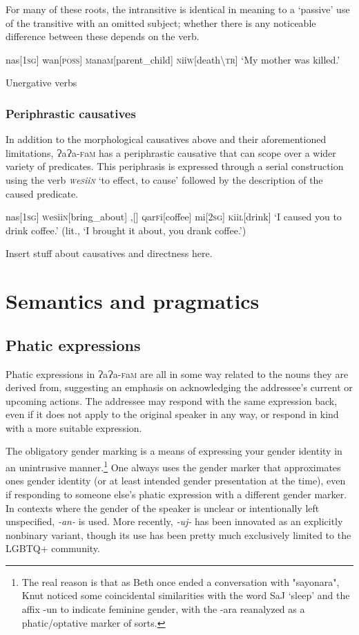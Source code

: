 \documentclass[a4paper,10pt,twoside,openright]{memoir}
\newcommand{\lang}{{\bigglot}a{\bigglot}a-\textsc{f}a\textsc{m}}
\newcommand{\bigglot}{Ɂ}
\newcommand{\famwordold}[5]{#1\textsc{#2}#3\textsc{#4}#5}
\newcommand\famword[1]{{\addfontfeatures{Letters=UppercaseSmallCaps}#1}}
\begin{document}
\noindent For many of these roots, the intransitive is identical in meaning to a `passive' use of the transitive with an omitted subject; whether there is any noticeable difference between these depends on the verb.

\ex
\begingl
nas[\textsc{1sg}]
wan[\textsc{poss}]
\famwordold{}{m}{ana}{m}{}[parent\_child]
\famwordold{}{n}{ii}{w}{}[death\textbackslash\textsc{tr}]
\glft `My mother was killed.'
\endgl
\xe

Unergative verbs

\subsection{Periphrastic causatives}

In addition to the morphological causatives above and their aforementioned limitations, \lang{} has a periphrastic causative that can scope over a wider variety of predicates. This periphrasis is expressed through a serial construction using the verb \textit{\textsc{w}\famwordold{e}{s}{ii}{n}{}} `to effect, to cause' followed by the description of the caused predicate. 

\ex
\begingl
nas[\textsc{1sg}]
\textsc{w}\famwordold{e}{s}{ii}{n}{}[bring\_about]
,[]
\famwordold{}{q}{ar}{f}{i}[coffee]
mi[\textsc{2sg}]
\famwordold{}{k}{ii}{l}{}[drink]
\glft `I caused you to drink coffee.' (lit., `I brought it about, you drank coffee.')
\endgl
\xe

Insert stuff about causatives and directness here.

\chapter{Semantics and pragmatics}
\section{Phatic expressions}

Phatic expressions in \lang{} are all in some way related to the nouns they are derived from, suggesting an emphasis on acknowledging the addressee's current or upcoming actions. The addressee may respond with the same expression back, even if it does not apply to the original speaker in any way, or respond in kind with a more suitable expression.

The obligatory gender marking is a means of expressing your gender identity in an unintrusive manner.\footnote{The real reason is that as Beth once ended a conversation with "sayonara", Knut noticed some coincidental similarities with the word \famword{SaJ} `sleep' and the affix -un to indicate feminine gender, with the -ara reanalyzed as a phatic/optative marker of sorts.} One always uses the gender marker that approximates ones gender identity (or at least intended gender presentation at the time), even if responding to someone else's phatic expression with a different gender marker. In contexts where the gender of the speaker is unclear or intentionally left unspecified, \textit{-an-} is used. More recently, \textit{-uj-} has been innovated as an explicitly nonbinary variant, though its use has been pretty much exclusively limited to the LGBTQ+ community.
\end{document}
